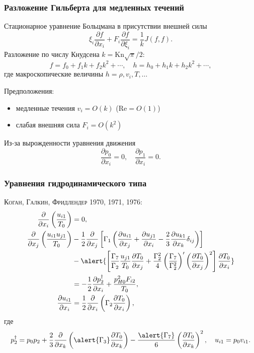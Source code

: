 \documentclass[mathserif]{beamer} %
\newcommand{\Kn}{\mathrm{Kn}}
\newcommand{\pder}[2][]{\frac{\partial#1}{\partial#2}}
\newcommand{\OO}[1]{O(#1)}
\newcommand{\Cite}[2][]{\alert{\textsc{#2 #1}}}
\begin{document}
\begin{frame}
    \frametitle{Разложение Гильберта для медленных течений}
    Стационарное уравнение Больцмана в присутствии внешней силы
    \begin{equation}\label{eq:Boltzmann}
        \xi_i\pder[f]{x_i} + F_i\pder[f]{\xi_i} = \frac1k J(f,f).
    \end{equation}
    Разложение по числу Кнудсена \(k=\Kn\sqrt\pi/2\):
    \begin{equation}\label{eq:expansion}
        f = f_0 + f_1k + f_2k^2 + \cdots, \quad h = h_0 + h_1k + h_2k^2 + \cdots,
    \end{equation}
    где макроскопические величины \(h = \rho, v_i, T, \dots\)
    \vspace{5pt}\pause

    Предположения:
    \begin{itemize}
        \item медленные течения \(v_i = \OO{k}\) (\(\mathrm{Re} = \OO{1}\))
        \item слабая внешняя сила \(F_i = \OO{k^2}\)
    \end{itemize}
    Из-за вырожденности уравнения движения
    \begin{equation}
        \pder[p_0]{x_i} = 0, \quad \pder[p_1]{x_i} = 0.
    \end{equation}
\end{frame}

\begin{frame}
    \frametitle{Уравнения гидродинамического типа}
    \Cite[1970, 1971, 1976]{Коган, Галкин, Фридлендер}:
    \begin{align*}
        \pder{x_i}\left(\frac{u_{i1}}{T_0}\right) &= 0, \\
        \pder{x_j}\left(\frac{u_{i1}u_{j1}}{T_0}\right)
            &-\frac12\pder{x_j}\left[\Gamma_1\left(
                \pder[u_{i1}]{x_j} + \pder[u_{j1}]{x_i} - \frac23\pder[u_{k1}]{x_k}\delta_{ij}
            \right)\right] \notag\\
            &-\alert{\left[
                \frac{\Gamma_7}{\Gamma_2}\frac{u_{j1}}{T_0}\pder[T_0]{x_j}
                + \frac{\Gamma_2^2}4 \left(\frac{\Gamma_7}{\Gamma_2^2}\right)'
                    \left(\pder[T_0]{x_j}\right)^2
            \right]\pder[T_0]{x_i}} \notag\\
            &= -\frac12\pder[p_2^\dag]{x_i} + \frac{p_{H0}^2 F_{i2}}{T_{0}}, \\
        \pder[u_{i1}]{x_i} &= \frac12\pder{x_i}\left(\Gamma_2\pder[T_0]{x_i}\right),
    \end{align*}
    где
    \begin{equation*}
        p_2^\dag = p_0 p_2
            + \frac23\pder{x_k}\left(\alert{\Gamma_3}\pder[T_0]{x_k}\right)
            - \frac{\alert{\Gamma_7}}{6}\left(\pder[T_0]{x_k}\right)^2, \quad u_{i1} = p_0v_{i1}.
    \end{equation*}
\end{frame}
\end{document}
